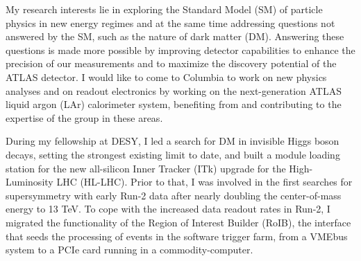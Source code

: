 \documentclass[a4paper]{article}
\begin{document}
\thispagestyle{fancy} 
 \lfoot{} \rfoot{\bf \thepage} \cfoot{}

\fontsize{11}{14}
\selectfont


My research interests lie in exploring the Standard Model (SM) of particle physics in new energy regimes
and at the same time addressing questions not answered by the SM, such as
the nature of dark matter (DM).
Answering these questions is made more possible by improving detector capabilities to enhance the precision of our measurements and to maximize the discovery potential of the ATLAS detector. I would like to come to Columbia to work on new physics analyses and on readout electronics by working on the next-generation ATLAS liquid argon (LAr) calorimeter system, benefiting from and contributing to the expertise of the group in these areas.

During my fellowship at DESY, I led a search for DM in invisible Higgs boson decays, setting the strongest existing limit to date, and built a module loading station for the new all-silicon Inner Tracker (ITk) upgrade for the High-Luminosity LHC (HL-LHC). Prior to that, I was involved in the first searches for supersymmetry with early Run-2 data after nearly doubling the center-of-mass energy to 13 TeV. To cope with the increased data readout rates in Run-2, I migrated the functionality of the Region of Interest Builder (RoIB), the interface that seeds the processing of events in the software trigger farm, from a VMEbus system to a PCIe card running in a commodity-computer.
\end{document}
